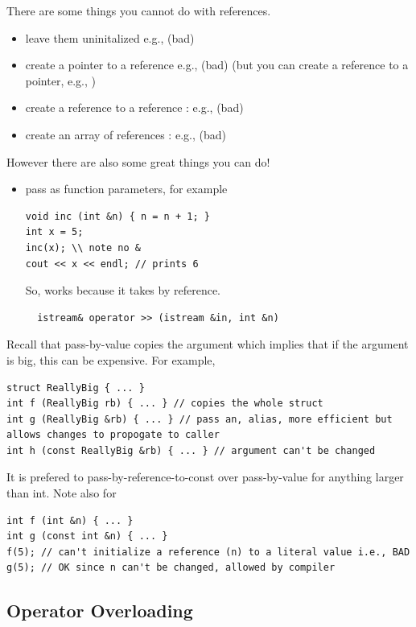 \documentclass[english, 11pt]{article}
\begin{document}
There are some things you cannot do with references.
\begin{itemize}
  \item leave them uninitalized e.g.,  (bad)
  \item create a pointer to a reference e.g.,  (bad) (but you can create a reference to a pointer, e.g., )
  \item create a reference to a reference : e.g.,  (bad)
  \item create an array of references : e.g.,  (bad)
\end{itemize}
However there are also some great things you can do!
\begin{itemize}
  \item pass as function parameters, for example
  \begin{lstlisting}
void inc (int &n) { n = n + 1; }
int x = 5;
inc(x); \\ note no &
cout << x << endl; // prints 6
  \end{lstlisting}
  So,  works because it takes  by reference.
  \begin{lstlisting}
  istream& operator >> (istream &in, int &n)
  \end{lstlisting}
\end{itemize}

Recall that pass-by-value copies the argument which implies that if the argument is big, this can be expensive. For example,
\begin{lstlisting}
struct ReallyBig { ... }
int f (ReallyBig rb) { ... } // copies the whole struct
int g (ReallyBig &rb) { ... } // pass an, alias, more efficient but allows changes to propogate to caller
int h (const ReallyBig &rb) { ... } // argument can't be changed
\end{lstlisting}
It is prefered to pass-by-reference-to-const over pass-by-value for anything larger than int. Note also for
\begin{lstlisting}
int f (int &n) { ... }
int g (const int &n) { ... }
f(5); // can't initialize a reference (n) to a literal value i.e., BAD
g(5); // OK since n can't be changed, allowed by compiler
\end{lstlisting}

\subsection{Operator Overloading}
\end{document}
